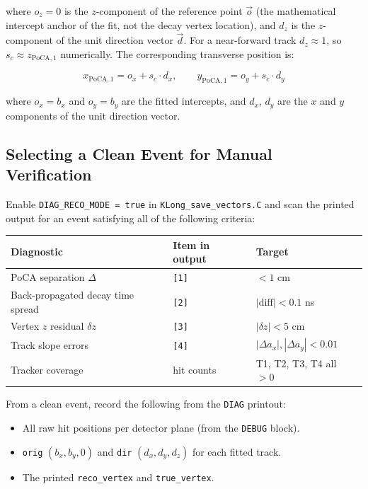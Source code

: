 \noindent
where $o_z = 0$ is the $z$-component of the reference point $\vec{o}$ (the mathematical intercept anchor of the fit, not the decay vertex location), and $d_z$ is the $z$-component of the unit direction vector $\vec{d}$. For a near-forward track $d_z \approx 1$, so $s_c \approx z_{\text{PoCA},1}$ numerically.
The corresponding transverse position is:

\begin{equation}
    x_{\text{PoCA},1} = o_x + s_c \cdot d_x, \qquad
    y_{\text{PoCA},1} = o_y + s_c \cdot d_y
\end{equation}

\noindent
where $o_x = b_x$ and $o_y = b_y$ are the fitted intercepts, and $d_x$, $d_y$ are the $x$ and $y$ components of the unit direction vector.

\subsection{Selecting a Clean Event for Manual Verification}

Enable \texttt{DIAG\_RECO\_MODE = true} in \texttt{KLong\_save\_vectors.C} and
scan the printed output for an event satisfying all of the following criteria:

\begin{center}
\begin{tabular}{lll}
    \toprule
    \textbf{Diagnostic} & \textbf{Item in output} & \textbf{Target} \\
    \midrule
    PoCA separation $\Delta$          & \texttt{[1]} & $< 1$ cm \\
    Back-propagated decay time spread & \texttt{[2]} & $|\text{diff}| < 0.1$ ns \\
    Vertex $z$ residual $\delta z$    & \texttt{[3]} & $|\delta z| < 5$ cm \\
    Track slope errors                & \texttt{[4]} & $|\Delta a_x|, |\Delta a_y| < 0.01$ \\
    Tracker coverage                  & hit counts   & T1, T2, T3, T4 all $> 0$ \\
    \bottomrule
\end{tabular}
\end{center}

From a clean event, record the following from the \texttt{DIAG} printout:
\begin{itemize}
    \item All raw hit positions per detector plane (from the \texttt{DEBUG} block).
    \item \texttt{orig} $(b_x, b_y, 0)$ and \texttt{dir} $(d_x, d_y, d_z)$ for each fitted track.
    \item The printed \texttt{reco\_vertex} and \texttt{true\_vertex}.
\end{itemize}

